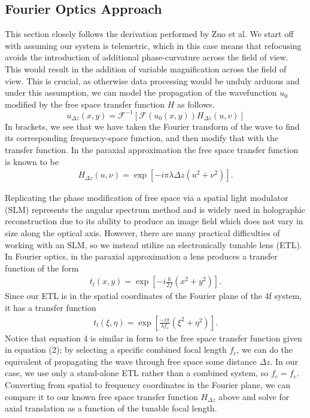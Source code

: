 \subsection{Fourier Optics Approach}
This section closely follows the derivation performed by Zuo et al. \cite{Zuo} We start off with assuming our system is telemetric, which in this case means that refocusing avoids the introduction of additional phase-curvature across the field of view. This would result in the addition of variable magnification across the field of view. This is crucial, as otherwise data processing would be unduly arduous and under this assumption, we can model the propagation of the wavefunction $u_0$ modified by the free space transfer function $H$ as follows. 
\begin{equation}
	u_{\Delta z}(x,y) = \mathcal{F}^{-1}\left[ \mathcal{F}(u_0(x,y))H_{\Delta z}(u,v)\right]
\end{equation}
In brackets, we see that we have taken the Fourier transform of the wave to find its corresponding frequency-space function, and then modify that with the transfer function. In the paraxial approximation the free space transfer function is known to be
\begin{gather}
	H_{\Delta z}(u,\nu) = \exp\left[-i \pi \lambda \Delta z (u^2 + \nu^2)\right].
\end{gather}
\par Replicating the phase modification of free space via a spatial light modulator (SLM) represents the angular spectrum method and is widely used in holographic reconstruction due to its ability to produce an image field which does not vary in size along the optical axis. However, there are many practical difficulties of working with an SLM, so we instead utilize an electronically tunable lens (ETL). In Fourier optics, in the paraxial approximation a lens produces a transfer function of the form \cite{Goodman}
\begin{gather}
	t_l(x,y) =\exp \left[ - i \frac{k}{2f}\left(x^2 + y^2\right)\right].
\end{gather}
Since our ETL is in the spatial coordinates of the Fourier plane of the 4f system, it has a transfer function
\begin{gather}
	t_l(\xi, \eta) = \exp\left[ \frac{-i \pi}{\lambda f_c}\left(\xi^2 + \eta^2\right)\right].
\end{gather}
Notice that equation 4 is similar in form to the free space transfer function given in equation (2); by selecting a specific combined focal length $f_c$, we can do the equivalent of propagating the wave through free space some distance $\Delta z$. In our case, we use only a stand-alone ETL rather than a combined system, so $f_c = f_e.$ Converting from  spatial to frequency coordinates in the Fourier plane,  we can compare it to our known free space transfer function $H_{\Delta z}$ above and solve for axial translation as a function of the tunable focal length.
